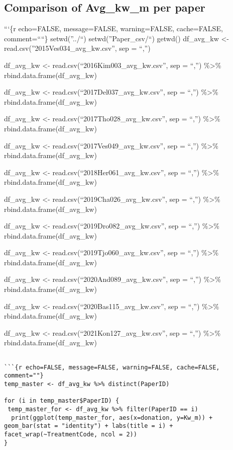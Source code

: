 \hypertarget{comparison-of-avg_kw_m-per-paper}{%
\subsection{Comparison of Avg\_kw\_m per
paper}\label{comparison-of-avg_kw_m-per-paper}}

```\{r echo=FALSE, message=FALSE, warning=FALSE, cache=FALSE,
comment=````\} setwd(''../``) setwd(''Paper\_csv/``) getwd() df\_avg\_kw
\textless- read.csv(''2015Ves034\_avg\_kw.csv'', sep = ``,'')

df\_avg\_kw \textless- read.csv(``2016Kim003\_avg\_kw.csv'', sep =
``,'') \%\textgreater\% rbind.data.frame(df\_avg\_kw)

df\_avg\_kw \textless- read.csv(``2017Del037\_avg\_kw.csv'', sep =
``,'') \%\textgreater\% rbind.data.frame(df\_avg\_kw)

df\_avg\_kw \textless- read.csv(``2017Tho028\_avg\_kw.csv'', sep =
``,'') \%\textgreater\% rbind.data.frame(df\_avg\_kw)

df\_avg\_kw \textless- read.csv(``2017Ves049\_avg\_kw.csv'', sep =
``,'') \%\textgreater\% rbind.data.frame(df\_avg\_kw)

df\_avg\_kw \textless- read.csv(``2018Her061\_avg\_kw.csv'', sep =
``,'') \%\textgreater\% rbind.data.frame(df\_avg\_kw)

df\_avg\_kw \textless- read.csv(``2019Cha026\_avg\_kw.csv'', sep =
``,'') \%\textgreater\% rbind.data.frame(df\_avg\_kw)

df\_avg\_kw \textless- read.csv(``2019Dro082\_avg\_kw.csv'', sep =
``,'') \%\textgreater\% rbind.data.frame(df\_avg\_kw)

df\_avg\_kw \textless- read.csv(``2019Tjo060\_avg\_kw.csv'', sep =
``,'') \%\textgreater\% rbind.data.frame(df\_avg\_kw)

df\_avg\_kw \textless- read.csv(``2020And089\_avg\_kw.csv'', sep =
``,'') \%\textgreater\% rbind.data.frame(df\_avg\_kw)

df\_avg\_kw \textless- read.csv(``2020Bas115\_avg\_kw.csv'', sep =
``,'') \%\textgreater\% rbind.data.frame(df\_avg\_kw)

df\_avg\_kw \textless- read.csv(``2021Kon127\_avg\_kw.csv'', sep =
``,'') \%\textgreater\% rbind.data.frame(df\_avg\_kw)

\begin{verbatim}

```{r echo=FALSE, message=FALSE, warning=FALSE, cache=FALSE, comment=""}
temp_master <- df_avg_kw %>% distinct(PaperID)

for (i in temp_master$PaperID) {
 temp_master_for <- df_avg_kw %>% filter(PaperID == i)
  print(ggplot(temp_master_for, aes(x=donation, y=Kw_m)) + geom_bar(stat = "identity") + labs(title = i) + facet_wrap(~TreatmentCode, ncol = 2))
}
\end{verbatim}

